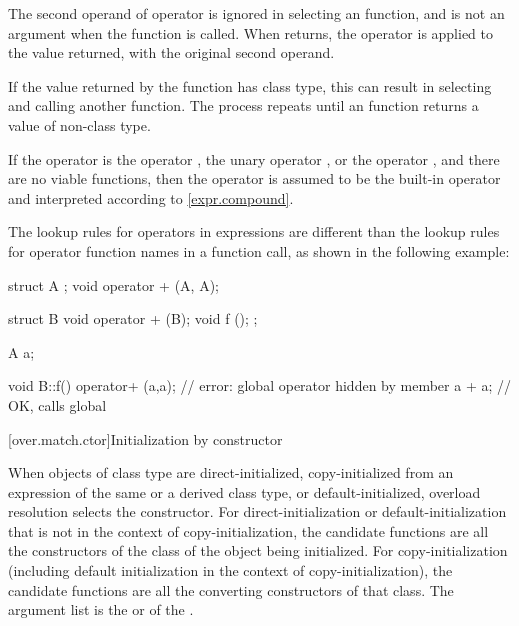 \pnum
The second operand of operator
\tcode{->}
is ignored in selecting an
function, and is not an argument when the
function is called.
When
returns, the operator
\tcode{->}
is applied to the value returned, with the original second
operand.
\begin{footnote}
If the value returned by the
function has class type, this can result in selecting and calling another
function.
The process repeats until an
function returns a value of non-class type.
\end{footnote}

\pnum
If the operator is the operator
\tcode{,},
the unary operator
\tcode{\&},
or the operator
\tcode{->},
and there are no viable functions, then the operator is
assumed to be the built-in operator and interpreted according to
\ref{expr.compound}.

\pnum
\begin{note}
The lookup rules for operators in expressions are different than
the lookup
rules for operator function names in a function call, as shown in the following
example:

\begin{codeblock}
struct A { };
void operator + (A, A);

struct B {
  void operator + (B);
  void f ();
};

A a;

void B::f() {
  operator+ (a,a);              // error: global operator hidden by member
  a + a;                        // OK, calls global 
}
\end{codeblock}
\end{note}

[over.match.ctor]{Initialization by constructor}%

\pnum
When objects of class type are direct-initialized,
copy-initialized from an expression of the same or a
derived class type,
or default-initialized,
overload resolution selects the constructor.
For direct-initialization or default-initialization
that is not in the context of copy-initialization, the
candidate functions are
all the constructors of the class of the object being
initialized.
For copy-initialization (including default initialization
in the context of copy-initialization), the candidate functions are all
the converting constructors of that
class.
The argument list is the
 or 
of the .

